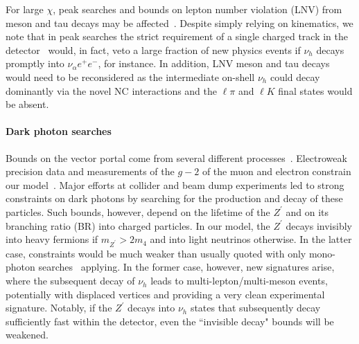 For large $\chi$, peak searches and bounds on lepton number violation (LNV) from meson and tau decays may be affected~\cite{Atre:2009rg,Abada:2017jjx}. Despite simply relying on kinematics, we note that in peak searches the strict requirement of a single charged track in the detector~\cite{Artamonov:2014urb} would, in fact, veto a large fraction of new physics events if $\nu_h$ decays promptly into $\nu_\alpha e^+e^-$, for instance. In addition, LNV meson and tau decays would need to be reconsidered as the intermediate on-shell $\nu_h$ could decay dominantly via the novel NC interactions and the $\ell \pi$ and $\ell K$ final states would be absent.

\paragraph{Dark photon searches} Bounds on the vector portal come from several different processes~\cite{Curtin:2014cca,Bauer:2018onh}. Electroweak precision data and measurements of the $g-2$ of the muon and electron constrain our model~\cite{Hook:2010tw}. Major efforts at collider and beam dump experiments led to strong constraints on dark photons by searching for the production and decay of these particles. Such bounds, however, depend on the lifetime of the $Z^\prime$ and on its branching ratio (BR) into charged particles. In our model, the $Z^\prime$ decays invisibly into heavy fermions if $m_{Z^\prime} > 2 m_4$ and into light neutrinos otherwise. In the latter case, constraints would be much weaker than usually quoted with only mono-photon searches~\cite{Lees:2017lec} applying. In the former case, however, new signatures arise, where the subsequent decay of $\nu_h$ leads to multi-lepton/multi-meson events, potentially with displaced vertices and providing a very clean experimental signature. Notably, if the $Z^\prime$ decays into $\nu_h$ states that subsequently decay sufficiently fast within the detector, even the ``invisible decay" bounds will be weakened.


